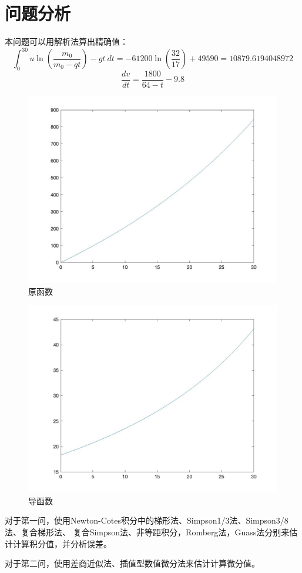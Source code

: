 \documentclass[a4paper,12pt]{ctexart}
\begin{document}
\section{问题分析}
\par
本问题可以用解析法算出精确值：
\begin{equation}
    \int_{0}^{30}u\ln{(\frac{m_0}{m_0-qt})}-gt\ dt=-61200\ln{(\frac{32}{17})}+49590=10879.6194048972
\end{equation}
\begin{equation}
    \frac{dv}{dt}=\frac{1800}{64-t}-9.8
\end{equation}
\begin{figure}[H]
    \centering
    \includegraphics[width=12cm]{第五章作业/yuanhanshu.jpg}
    \caption{原函数}
\end{figure}
\begin{figure}[H]
    \centering
    \includegraphics[width=12cm]{第五章作业/daohanshu.jpg}
    \caption{导函数}
\end{figure}
\par
对于第一问，使用Newton-Cotes积分中的梯形法、Simpson1/3法、Simpson3/8法、复合梯形法、
复合Simpson法、非等距积分，Romberg法，Guass法分别来估计计算积分值，并分析误差。
\par
对于第二问，使用差商近似法、插值型数值微分法来估计计算微分值。
\end{document}
